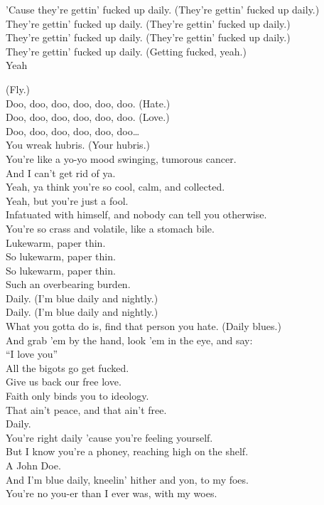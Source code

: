 'Cause they're gettin' fucked up daily. (They're gettin' fucked up daily.) \\
They're gettin' fucked up daily. (They're gettin' fucked up daily.) \\
They're gettin' fucked up daily. (They're gettin' fucked up daily.) \\
They're gettin' fucked up daily. (Getting fucked, yeah.) \\
Yeah

(Fly.) \\
Doo, doo, doo, doo, doo, doo. (Hate.) \\
Doo, doo, doo, doo, doo, doo. (Love.) \\
Doo, doo, doo, doo, doo, doo… \\

You wreak hubris. (Your hubris.) \\
You're like a yo-yo mood swinging, tumorous cancer. \\
And I can't get rid of ya. \\
Yeah, ya think you're so cool, calm, and collected. \\
Yeah, but you're just a fool. \\
Infatuated with himself, and nobody can tell you otherwise. \\
You're so crass and volatile, like a stomach bile. \\
Lukewarm, paper thin. \\
So lukewarm, paper thin. \\
So lukewarm, paper thin. \\
Such an overbearing burden. \\

Daily. (I'm blue daily and nightly.) \\
Daily. (I'm blue daily and nightly.) \\

What you gotta do is, find that person you hate. (Daily blues.) \\
And grab 'em by the hand, look 'em in the eye, and say: \\
``I love you'' \\
All the bigots go get fucked. \\
Give us back our free love. \\
Faith only binds you to ideology. \\
That ain't peace, and that ain't free. \\
Daily. \\

You're right daily 'cause you're feeling yourself. \\
But I know you're a phoney, reaching high on the shelf. \\
A John Doe. \\
And I'm blue daily, kneelin' hither and yon, to my foes. \\
You're no you-er than I ever was, with my woes. \\

